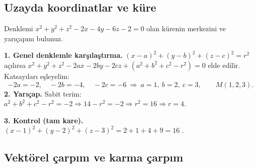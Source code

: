 \subsection{Uzayda koordinatlar ve küre}

\begin{soru}
Denklemi $x^2+y^2+z^2-2x-4y-6z-2=0$ olan kürenin merkezini ve yarıçapını bulunuz. 
\end{soru}
\begin{cevap}
\textbf{1. Genel denklemle karşılaştırma.} $(x-a)^2+(y-b)^2+(z-c)^2=r^2$ açılırsa
$x^2+y^2+z^2-2ax-2by-2cz+(a^2+b^2+c^2-r^2)=0$ elde edilir. Katsayıları eşleyelim:
\[
-2a=-2,\quad -2b=-4,\quad -2c=-6\ \Rightarrow\ a=1,\ b=2,\ c=3,\qquad M(1,2,3).
\]
\textbf{2. Yarıçap.} Sabit terim: $a^2+b^2+c^2-r^2=-2\Rightarrow 14-r^2=-2\Rightarrow r^2=16\Rightarrow r=4$.

\textbf{3. Kontrol (tam kare).} $(x-1)^2+(y-2)^2+(z-3)^2=2+1+4+9=16$ \checkmark.
\end{cevap}

\subsection{Vektörel çarpım ve karma çarpım}

